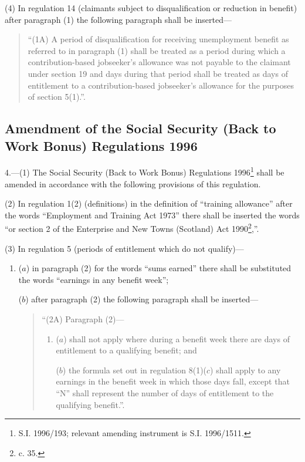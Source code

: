 \documentclass[12pt,a4paper]{article}
\begin{document}
(4) In regulation 14 (claimants subject to disqualification or reduction in benefit) after paragraph (1) the following paragraph shall be inserted—
\begin{quotation}
“(1A) A period of disqualification for receiving unemployment benefit as referred to in paragraph (1) shall be treated as a period during which a contribution-based jobseeker’s allowance was not payable to the claimant under section 19 and days during that period shall be treated as days of entitlement to a contribution-based jobseeker’s allowance for the purposes of section 5(1).”.
\end{quotation}

\subsection[4. Amendment of the Social Security (Back to Work Bonus) Regulations 1996]{Amendment of the Social Security (Back to Work Bonus) Regulations 1996}

4.—(1) The Social Security (Back to Work Bonus) Regulations 1996\footnote{\frenchspacing S.I. 1996/193; relevant amending instrument is S.I. 1996/1511.} shall be amended in accordance with the following provisions of this regulation.

(2) In regulation 1(2) (definitions) in the definition of “training allowance” after the words “Employment and Training Act 1973” there shall be inserted the words “or section 2 of the Enterprise and New Towns (Scotland) Act 1990\footnote{ c. 35.},”.

(3) In regulation 5 (periods of entitlement which do not qualify)—
\begin{enumerate}\item[]
($a$) in paragraph (2) for the words “sums earned” there shall be substituted the words “earnings in any benefit week”;

($b$) after paragraph (2) the following paragraph shall be inserted—
\begin{quotation}
“(2A) Paragraph (2)—
\begin{enumerate}\item[]
($a$) shall not apply where during a benefit week there are days of entitlement to a qualifying benefit; and

($b$) the formula set out in regulation 8(1)($c$) shall apply to any earnings in the benefit week in which those days fall, except that “N” shall represent the number of days of entitlement to the qualifying benefit.”.
\end{enumerate}
\end{quotation}
\end{enumerate}
\end{document}
